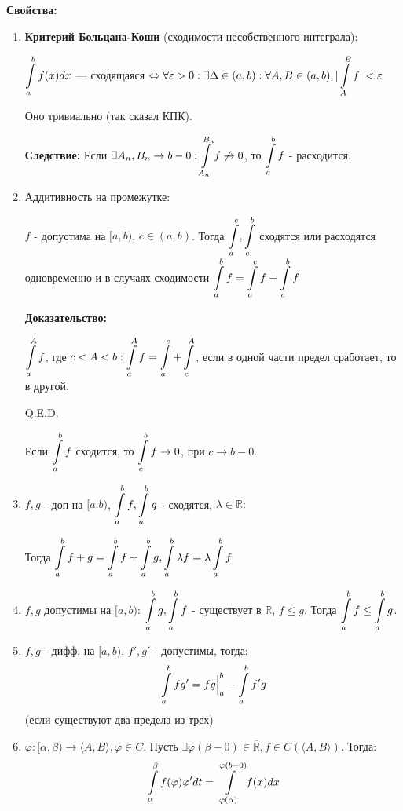 \textbf{Свойства:}
\begin{enumerate}
    \item \textbf{Критерий Больцана-Коши} (сходимости несобственного интеграла):
  
  $\displaystyle\int\limits_{a}^{b}f(x)dx$ --- сходящаяся $\Leftrightarrow \forall \varepsilon >0:\exists \Delta \in (a,b): \forall A,B\in (a,b),  |\displaystyle\int\limits_{A}^{B}f|< \varepsilon$
  
  Оно тривиально (так сказал КПК).

  \textbf{Следствие:} Если $\exists A_n,B_n \rightarrow b-0: \displaystyle\int\limits_{A_n}^{B_n}f \not \rightarrow 0$, то $\displaystyle\int\limits_{a}^{b}f$ - расходится.

  \item Аддитивность на промежутке:

$f$ - допустима на $[a,b)$, $c \in (a,b)$. Тогда $\displaystyle\int\limits_{a}^{c}, \displaystyle\int\limits_{c}^{b}$ сходятся или расходятся одновременно и в случаях сходимости $\displaystyle\int\limits_{a}^{b}f = \displaystyle\int\limits_{a}^{c}f + \displaystyle\int\limits_{c}^{b}f$

\textbf{Доказательство:}

$\displaystyle\int\limits_{a}^{A}f$, где $c<A<b: \displaystyle\int\limits_{a}^{A}f = \displaystyle\int\limits_{a}^{c}+\displaystyle\int\limits_{c}^{A}$, если в одной части предел сработает, то в другой.

\hfill Q.E.D.

Если $\displaystyle\int\limits_{a}^{b}f$ сходится, то $\displaystyle\int\limits_{c}^{b} f \rightarrow 0$, при $c\rightarrow b - 0$.

\item $f,g$ - доп на $[a.b)$, $\displaystyle\int\limits_{a}^{b}f,\displaystyle\int\limits_{a}^{b}g$ - сходятся, $\lambda\in \mathbb{R}:$

Тогда $\displaystyle\int\limits_{a}^{b}f +g = \displaystyle\int\limits_{a}^{b}f + \displaystyle\int\limits_{a}^{b}g, \displaystyle\int\limits_{a}^{b}\lambda f = \lambda \displaystyle\int\limits_{a}^{b}f$

\item  $f,g$ допустимы на $[a,b)$: $\displaystyle\int\limits_{a}^{b}g,\displaystyle\int\limits_{a}^{b}f$ - существует в $\mathbb{R}$, $f\leq g$. Тогда $\displaystyle\int\limits_{a}^{b}f \leq \displaystyle\int\limits_{a}^{b}g$.

\item $f,g$ - дифф. на $[a,b)$, $f',g'$ - допустимы, тогда:
$$\displaystyle\int\limits_{a}^{b}fg' = fg\Big|_a^b - \displaystyle\int\limits_{a}^{b}f'g$$
(если существуют два предела из трех)

\item $\varphi: [\alpha, \beta) \rightarrow \langle A, B \rangle, \varphi \in C.$ Пусть $\exists \varphi(\beta-0)\in \overline{\mathbb{R}}, f\in C(\langle A,B\rangle)$. Тогда:
$$\displaystyle\int\limits_{\alpha}^{\beta}f(\varphi)\varphi'dt = \displaystyle\int\limits_{\varphi(\alpha)}^{\varphi(b-0)}f(x) dx$$

\end{enumerate}

